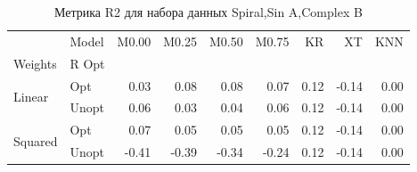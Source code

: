 \begin{table}
\caption{Метрика R2 для набора данных Spiral,Sin A,Complex B}
\label{tab:R2_Spiral,Sin A,Complex B}
\begin{tabular}{llrrrrrrr}
\toprule
 & Model & M0.00 & M0.25 & M0.50 & M0.75 & KR & XT & KNN \\
Weights & R Opt &  &  &  &  &  &  &  \\
\midrule
\multirow[t]{2}{*}{Linear} & Opt & 0.03 & 0.08 & 0.08 & 0.07 & 0.12 & -0.14 & 0.00 \\
 & Unopt & 0.06 & 0.03 & 0.04 & 0.06 & 0.12 & -0.14 & 0.00 \\

\multirow[t]{2}{*}{Squared} & Opt & 0.07 & 0.05 & 0.05 & 0.05 & 0.12 & -0.14 & 0.00 \\
 & Unopt & -0.41 & -0.39 & -0.34 & -0.24 & 0.12 & -0.14 & 0.00 \\

\bottomrule
\end{tabular}
\end{table}
